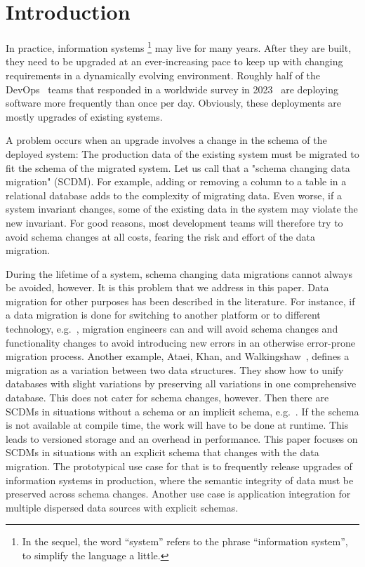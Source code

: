 \documentclass[runningheads]{llncs}
\begin{document}
\section{Introduction}
\label{sct:Introduction}
   In practice, information systems%
   \footnote{In the sequel, the word ``system'' refers to the phrase ``information system'', to simplify the language a little.}
   may live for many years.
   After they are built, they need to be upgraded at an ever-increasing pace to keep up with changing requirements in a dynamically evolving environment.
   Roughly half of the DevOps~\cite{BassWeberZhu15} teams that responded in a worldwide survey in 2023~\cite{HumanitecDevOps2023} are deploying software more frequently than once per day.
   Obviously, these deployments are mostly upgrades of existing systems.

   A problem occurs when an upgrade involves a change in the schema of the deployed system:
   The production data of the existing system must be migrated to fit the schema of the migrated system.
   Let us call that a "schema changing data migration" (SCDM).
   For example, adding or removing a column to a table in a relational database adds to the complexity of migrating data.
   Even worse, if a system invariant changes, some of the existing data in the system may violate the new invariant.
   For good reasons, most development teams will therefore try to avoid schema changes at all costs, fearing the risk and effort of the data migration.

   During the lifetime of a system, schema changing data migrations cannot always be avoided, however.
   It is this problem that we address in this paper.
   Data migration for other purposes has been described in the literature.
   For instance, if a data migration is done for switching to another platform or to different technology,
   e.g.~\cite{Gholami2016,Bisbal1999},
   migration engineers can and will avoid schema changes and functionality changes to avoid introducing new errors in an otherwise error-prone migration process.
   Another example, Ataei, Khan, and Walkingshaw~\cite{Ataei2021,Walkingshaw2014}, defines a migration as a variation between two data structures.
   They show how to unify databases with slight variations by preserving all variations in one comprehensive database.
   This does not cater for schema changes, however.
   Then there are SCDMs in situations without a schema or an implicit schema, e.g.~\cite{Hillenbrand2022}.
   If the schema is not available at compile time, the work will have to be done at runtime.
   This leads to versioned storage and an overhead in performance.
   This paper focuses on SCDMs in situations with an explicit schema that changes with the data migration.
   The prototypical use case for that is to frequently release upgrades of information systems in production,
   where the semantic integrity of data must be preserved across schema changes.
   Another use case is application integration for multiple dispersed data sources with explicit schemas.
\end{document}
